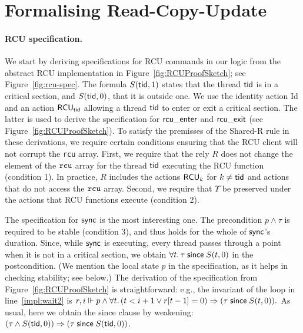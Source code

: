 
\section{Formalising Read-Copy-Update}\label{sec:rcu}


\paragraph{RCU specification.} We start by deriving specifications for RCU
commands in our logic from the abstract RCU implementation in
Figure~\ref{fig:RCUProofSketch}; see Figure~\ref{fig:rcu-spec}.  The formula
$S({\sf tid},1)$ states that the thread ${\sf tid}$ is in a critical section, and $S({\sf tid},0)$, that
it is outside one. We use the identity action {\sf Id} and an action $\textsf{RCU}_{\sf tid}$
allowing a thread ${\sf tid}$ to enter or exit a critical section. The latter
is used to derive the specification for ${\sf rcu\_enter}$ and ${\sf rcu\_exit}$ (see
Figure~\ref{fig:RCUProofSketch}). To satisfy the premisses of the {\sc Shared-R}
rule in these derivations, we require certain conditions ensuring that the RCU
client will not corrupt the {\tt rcu} array. First, we require that the rely $R$
does not change the element of the $\texttt{rcu}$ array for the thread ${\sf tid}$ executing the
RCU function (condition 1). In practice, $R$ includes the actions $\textsf{RCU}_k$
for $k\not={\sf tid}$ and actions that do not access the $\texttt{rcu}$ array. Second, we
require that $\Upsilon$ be preserved under the actions that RCU
functions execute (condition 2).


The specification for ${\sf sync}$ is the most interesting one. The precondition $p
\wedge \tau$ is required to be stable (condition 3), and thus holds for the
whole of ${\sf sync}$'s duration. Since, while ${\sf sync}$ is executing, every thread
passes through a point when it is not in a critical section, we obtain $\forall
t.\, \tau \;\mathsf{since}\; S(t, 0)$ in the postcondition. (We mention the local state $p$
in the specification, as it helps in checking stability; see below.)  The
derivation of the specification from Figure~\ref{fig:RCUProofSketch} is
straightforward: e.g., the invariant of the loop in line~\ref{impl:wait2} is
$
r, i \Vdash p \wedge \forall t.\, (t < i+1 \vee r[t-1] = 0) 
\Rightarrow
(\tau \;\mathsf{since}\; S(t,0)).
$
As usual, here we obtain the {\sf since} clause 
by weakening: $(\tau \wedge S({\sf tid}, 0)) \Rightarrow (\tau \;\mathsf{since}\; S({\sf tid}, 0))$.

